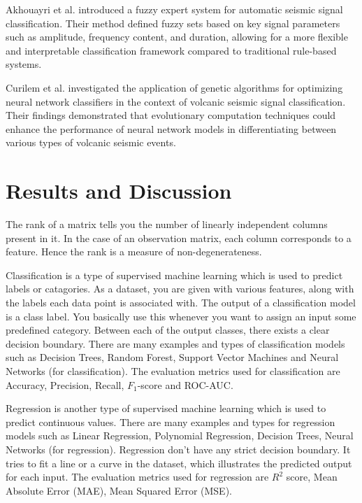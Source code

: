 \documentclass[conference]{IEEEtran}
\begin{document}
Akhouayri et al. \cite{b9}
introduced a fuzzy expert system for automatic seismic signal classification.
Their method defined fuzzy sets based on key signal parameters such as
amplitude, frequency content, and duration, allowing for a more flexible and
interpretable classification framework compared to traditional rule-based
systems.


Curilem et al. \cite{b10} investigated the application of genetic
algorithms for optimizing neural network classifiers in the context of volcanic
seismic signal classification. Their findings demonstrated that evolutionary
computation techniques could enhance the performance of neural network models in
differentiating between various types of volcanic seismic events.
\section{Results and Discussion}
\label{sec:org5eba458}
The rank of a matrix tells you the number of linearly independent columns
present in it. In the case of an observation matrix, each column corresponds to
a feature. Hence the rank is a measure of non-degenerateness.


Classification is a type of supervised machine learning which is used to predict
labels or catagories. As a dataset, you are given with various features, along
with the labels each data point is associated with. The output of a
classification model is a class label. You basically use this whenever you want
to assign an input some predefined category. Between each of the output classes,
there exists a clear decision boundary. There are many examples and types of
classification models such as Decision Trees, Random Forest, Support Vector
Machines and Neural Networks (for classification). The evaluation metrics used
for classification are Accuracy, Precision, Recall, \(F_{1}\)-score and ROC-AUC.


Regression is another type of supervised machine learning which is used to
predict continuous values. There are many examples and types for regression
models such as Linear Regression, Polynomial Regression, Decision Trees, Neural
Networks (for regression). Regression don't have any strict decision boundary.
It tries to fit a line or a curve in the dataset, which illustrates the
predicted output for each input. The evaluation metrics used for regression are \(R^{2}\) score, Mean Absolute Error (MAE), Mean Squared Error (MSE).
\end{document}
